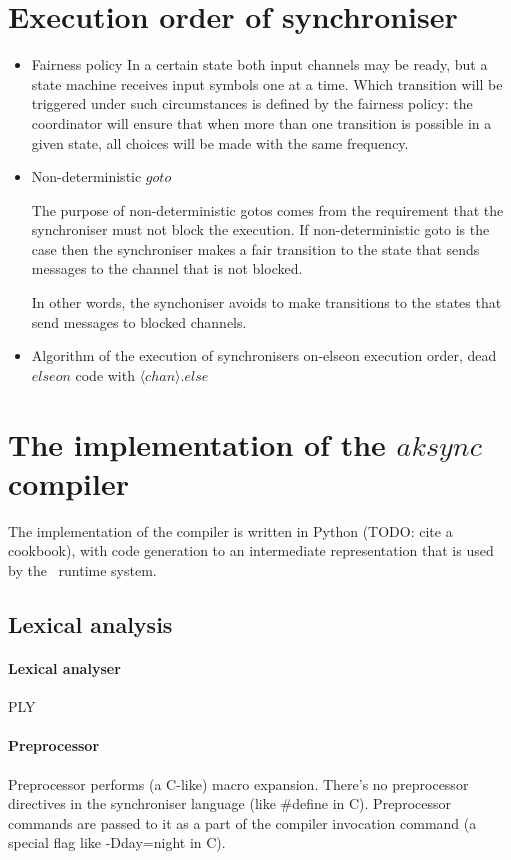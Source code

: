 \section{Execution order of synchroniser\label{execod}}
\begin{itemize}
\item Fairness policy
In a certain state both input channels may be ready, but a state machine receives input symbols one at a time. Which transition will be triggered under such circumstances is defined by the fairness policy: the coordinator will ensure that when more than one transition is possible in a given state, all choices will be made with the same frequency.

\item Non-deterministic $goto$

The purpose of non-deterministic gotos comes from the requirement that the synchroniser must not block the execution. If non-deterministic goto is the case then the synchroniser makes a fair transition to the state that sends messages to the channel that is not blocked.

In other words, the synchoniser avoids to make transitions to the states that send messages to blocked channels.


\item Algorithm of the execution of synchronisers
on-elseon execution order, dead $elseon$ code with $\langle chan \rangle .else$
\end{itemize}


\section{The implementation of the $aksync$ compiler}
The implementation of the compiler is written in Python (TODO: cite a cookbook), with code generation to an intermediate representation that is used by the \ak\ runtime system.

\subsection{Lexical analysis}
  \paragraph{Lexical analyser} PLY
  \paragraph{Preprocessor}
Preprocessor performs (a C-like) macro expansion. There's no preprocessor directives in the synchroniser language (like \#define in C). Preprocessor commands are passed to it as a part of the compiler invocation command (a special flag like -Dday=night in C).

